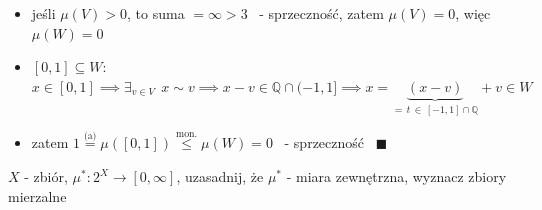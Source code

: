 \documentclass[a4paper,12pt]{article}
\begin{document}
\begin{itemize}
\begin{align*}
    \end{align*}
    \item jeśli \(\mu(V) > 0\), to suma \(= \infty > 3\) \, - sprzeczność, \; zatem \(\mu(V) = 0\), więc \(\mu(W) = 0\)
    \item \([0, 1] \subseteq W\): \, \(x \in [0, 1] \implies \exists_{v \in V} \;\, x \sim v \implies x - v \in \mathbb{Q} \cap (-1, 1] \implies x = \underbrace{(x - v)}_{= \, t \, \in \, [-1, 1] \cap \mathbb{Q}} + v \in W\)
    \item zatem \(1 \overset{\text{(a)}}{=} \mu([0, 1]) \overset{\text{mon.}}{\leq} \mu(W) = 0\) \, - sprzeczność \, \(\blacksquare\)
\end{itemize}

\bigskip
{} \; \(X\) - zbiór, \; \(\mu^*: 2^X \to [0, \infty]\), \; uzasadnij, że \(\mu^*\) - miara zewnętrzna, wyznacz zbiory mierzalne
\end{document}
